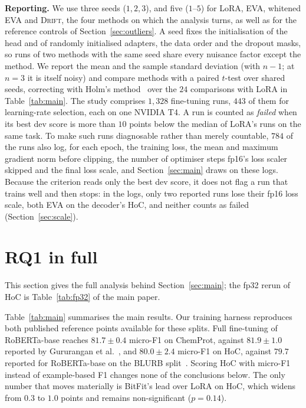 \documentclass[conference,onecolumn]{IEEEtran}
\newcommand{\method}{\textsc{Drift}}
\begin{document}
\noindent\textbf{Reporting.}
We use three seeds ($1,2,3$), and five ($1$--$5$) for LoRA, EVA, whitened EVA
and \method{}, the four methods on which the analysis turns, as well as for the
reference controls of Section~\ref{sec:outliers}. A seed fixes the
initialisation of the head and of randomly initialised adapters, the data order
and the dropout masks, so runs of two methods with the same seed share every
nuisance factor except the method. We report the mean and the sample standard
deviation (with $n-1$; at $n = 3$ it is itself noisy) and compare methods with a
paired $t$-test over shared seeds, correcting with Holm's
method~\cite{holm1979} over the $24$ comparisons with LoRA in
Table~\ref{tab:main}. The study comprises $1{,}328$ fine-tuning runs,
$443$ of them for learning-rate selection, each on one NVIDIA T4. A run is
counted as \emph{failed} when its best dev score is more than $10$ points below
the median of LoRA's runs on the same task. To make such runs diagnosable rather
than merely countable, $784$ of the runs also log, for each epoch, the training
loss, the mean and maximum gradient norm before clipping, the number of optimiser
steps fp16's loss scaler skipped and the final loss scale, and
Section~\ref{sec:main} draws on these logs. Because the criterion reads only the
best dev score, it does not flag a run that trains well and then stops: in the
logs, only two reported runs lose their fp16 loss scale, both EVA on the
decoder's HoC, and neither counts as failed (Section~\ref{sec:scale}).

\section{RQ1 in full}
\label{sup:rq1}
This section gives the full analysis behind Section~\ref{sec:main}; the fp32 rerun of HoC is Table~\ref{tab:fp32} of the main paper.

Table~\ref{tab:main} summarises the main results. Our training harness
reproduces both published reference points available for these splits. Full
fine-tuning of RoBERTa-base reaches $81.7\pm0.4$ micro-F1 on ChemProt, against
$81.9\pm1.0$ reported by Gururangan et al.~\cite{gururangan2020dapt}, and
$80.0\pm2.4$ micro-F1 on HoC, against $79.7$ reported for RoBERTa-base on the
BLURB split~\cite{gu2021pubmedbert}. Scoring HoC with micro-F1 instead of
example-based F1 changes none of the conclusions below. The only number that
moves materially is BitFit's lead over LoRA on HoC, which widens from $0.3$ to
$1.0$ points and remains non-significant ($p = 0.14$).
\end{document}
